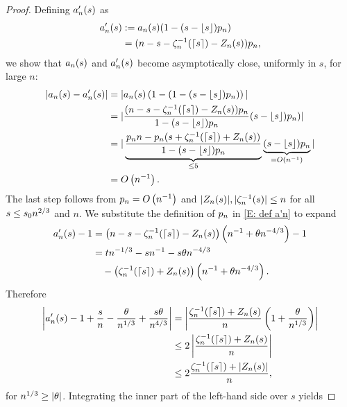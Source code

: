 \begin{proof}
	Defining $a'_n(s)$ as
	\begin{equation} \label{E: def a'n}
	\begin{aligned}
	a'_n(s) &:= a_n(s) (1 - (s - \lfloor s\rfloor)p_n) \\
	&= (n - s - \zeta^{-1}_n(\lceil s\rceil) - Z_n(s)) p_n,
	\end{aligned}
	\end{equation}
	we show that $a_n(s)$ and $a'_n(s)$ become asymptotically close, uniformly in $s$, for large $n$:
	\begin{equation} \label{E: convergence an amn}
	\begin{aligned}
	|a_n(s) - a'_n(s)|
	&= |a_n(s)\left( 1-(1 - (s - \lfloor s\rfloor)p_n) \right)| \\
	&= | \frac{(n - s - \zeta^{-1}_n(\lceil s\rceil) - Z_n(s))p_n}{1-(s - \lfloor s\rfloor)p_n} (s - \lfloor s\rfloor)p_n) | \\
	&= |\underbrace{\frac{p_n n - p_n(s + \zeta^{-1}_n(\lceil s\rceil) + Z_n(s))}{1-(s - \lfloor s\rfloor)p_n}}_{\leq 5} 
	\underbrace{(s - \lfloor s\rfloor)p_n}_{=O\left(n^{-1}\right)} |\\
	&= O\left(n^{-1}\right).
	\end{aligned}
	\end{equation}
	The last step follows from $p_n = O\left(n^{-1}\right)$ and $|Z_n(s)|, |\zeta^{-1}_n(s)| \leq n$ for all $s \leq s_0n^{2 / 3}$ and $n$.
	We substitute the definition of $p_n$ in \eqref{E: def a'n} to expand
	\begin{align*}
	a'_n(s) - 1 
	&= \left( n - s - \zeta^{-1}_n(\lceil s\rceil) - Z_n(s) \right) \left( n^{-1} + \theta n^{-4 / 3} \right) - 1 \\
	&= tn^{-1 / 3} - sn^{-1} - s\theta n^{-4 / 3} \\
	&\quad - \left( \zeta^{-1}_n(\lceil s\rceil) + Z_n(s) \right) \left( n^{-1} + \theta n^{-4 / 3} \right).
	\end{align*}
	Therefore
	\begin{equation} \label{E: an zeta Z / n} 
	\begin{aligned}
	\left| a'_n(s) - 1 + \frac{s}{n} - \frac{\theta}{n^{1 / 3}} + \frac{s\theta}{n^{4 / 3}} \right|
	&= \left| \frac{\zeta^{-1}_n(\lceil s\rceil) + Z_n(s)}{n} \left( 1 + \frac{\theta}{n^{1 / 3}} \right) \right| \\
	&\leq 2 \left| \frac{\zeta^{-1}_n(\lceil s\rceil) + Z_n(s)}{n} \right| \\
	&\leq 2 \frac{\zeta^{-1}_n(\lceil s\rceil) + |Z_n(s)|}{n} ,  
	\end{aligned}
	\end{equation}
	for $n^{1 / 3} \geq |\theta|$.
	Integrating the inner part of the left-hand side over $s$ yields

\end{proof}
